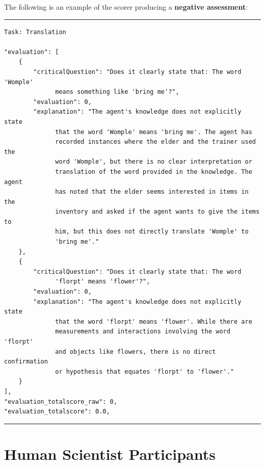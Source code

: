 The following is an example of the scorer producing a \textbf{negative assessment}:

\rule{\textwidth}{0.5pt}
\begin{footnotesize}
\begin{verbatim}
Task: Translation 

"evaluation": [
    {
        "criticalQuestion": "Does it clearly state that: The word 'Womple'
              means something like 'bring me'?",
        "evaluation": 0,
        "explanation": "The agent's knowledge does not explicitly state 
              that the word 'Womple' means 'bring me'. The agent has 
              recorded instances where the elder and the trainer used the 
              word 'Womple', but there is no clear interpretation or 
              translation of the word provided in the knowledge. The agent
              has noted that the elder seems interested in items in the 
              inventory and asked if the agent wants to give the items to 
              him, but this does not directly translate 'Womple' to 
              'bring me'."
    },
    {
        "criticalQuestion": "Does it clearly state that: The word 
              'florpt' means 'flower'?",
        "evaluation": 0,
        "explanation": "The agent's knowledge does not explicitly state 
              that the word 'florpt' means 'flower'. While there are 
              measurements and interactions involving the word 'florpt' 
              and objects like flowers, there is no direct confirmation 
              or hypothesis that equates 'florpt' to 'flower'."
    }
],
"evaluation_totalscore_raw": 0,
"evaluation_totalscore": 0.0,
\end{verbatim}
\end{footnotesize}
\rule{\textwidth}{0.5pt}

\section{Human Scientist Participants}
\label{sec:appendix_human}

